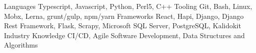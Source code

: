 
\begin{cvskills}
  \cvskill
    {Languages} %
    {Typescript, Javascript, Python, Perl5, C++} %
  \cvskill
    {Tooling}
    {Git, Bash, Linux, Mobx, Lerna, grunt/gulp, npm/yarn}
  \cvskill
    {Frameworks} %
    {React, Hapi, Django, Django Rest Framework, Flask, Scrapy, Microsoft SQL Server, PostgreSQL, Kalidokit} %
  \cvskill
    {Industry Knowledge}
    {CI/CD, Agile Software Development, Data Structures and Algorithms}
\end{cvskills}
